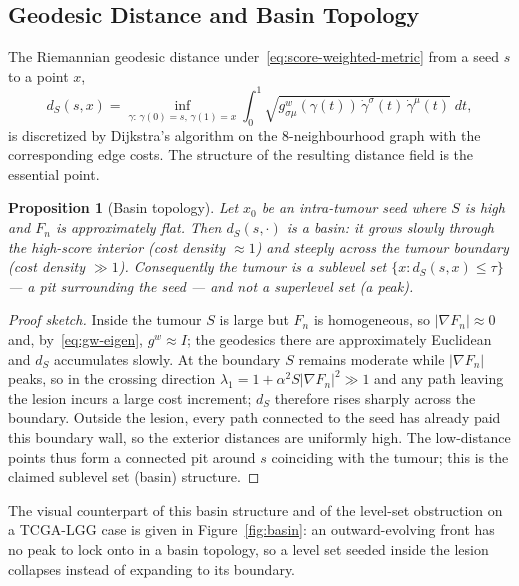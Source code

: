 \documentclass[11pt,a4paper]{article}
\newtheorem{proposition}{Proposition}
\begin{document}
\subsection{Geodesic Distance and Basin Topology}\label{sec:geodesic-basin}

The Riemannian geodesic distance under~\eqref{eq:score-weighted-metric} from a seed
$s$ to a point $x$,
\begin{equation}
d_S(s,x)=\inf_{\gamma:\,\gamma(0)=s,\,\gamma(1)=x}\int_0^1\sqrt{g^{w}_{\sigma\mu}(\gamma(t))\,\dot\gamma^\sigma(t)\,\dot\gamma^\mu(t)}\;dt,
\label{eq:geodesic-dist}
\end{equation}
is discretized by Dijkstra's algorithm on the $8$-neighbourhood graph with the
corresponding edge costs. The structure of the resulting distance field is the
essential point.

\begin{proposition}[Basin topology]\label{prop:basin}
Let $x_0$ be an intra-tumour seed where $S$ is high and $F_n$ is approximately
flat. Then $d_S(s,\cdot)$ is a \emph{basin}: it grows slowly through the
high-score interior (cost density $\approx1$) and steeply across the tumour
boundary (cost density $\gg1$). Consequently the tumour is a sublevel set
$\{x:d_S(s,x)\le\tau\}$ --- a pit surrounding the seed --- and not a superlevel set
(a peak).
\end{proposition}

\begin{proof}[Proof sketch]
Inside the tumour $S$ is large but $F_n$ is homogeneous, so $|\nabla F_n|\approx0$
and, by~\eqref{eq:gw-eigen}, $g^{w}\approx I$; the geodesics there are
approximately Euclidean and $d_S$ accumulates slowly. At the boundary $S$ remains
moderate while $|\nabla F_n|$ peaks, so in the crossing direction
$\lambda_1=1+\alpha^2 S|\nabla F_n|^2\gg1$ and any path leaving the lesion incurs a
large cost increment; $d_S$ therefore rises sharply across the boundary. Outside
the lesion, every path connected to the seed has already paid this boundary wall,
so the exterior distances are uniformly high. The low-distance points thus form a
connected pit around $s$ coinciding with the tumour; this is the claimed sublevel
set (basin) structure.
\end{proof}

The visual counterpart of this basin structure and of the level-set obstruction on
a TCGA-LGG case is given in Figure~\ref{fig:basin}: an outward-evolving front has
no peak to lock onto in a basin topology, so a level set seeded inside the lesion
collapses instead of expanding to its boundary.
\end{document}
